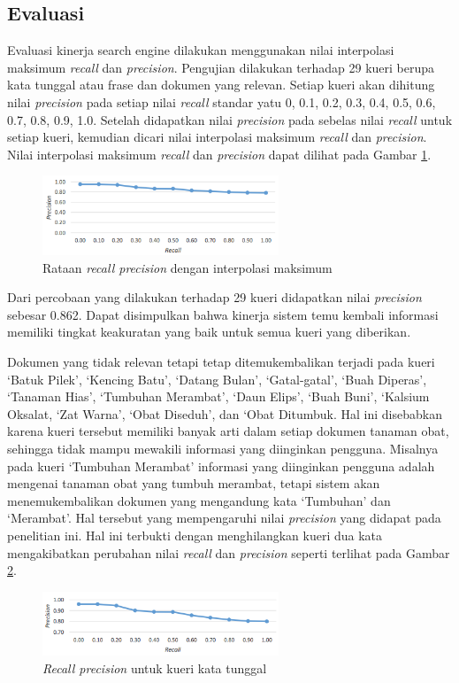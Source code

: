 \subsection*{Evaluasi}
Evaluasi kinerja search engine dilakukan menggunakan nilai interpolasi maksimum \textit{recall} dan \textit{precision}. Pengujian dilakukan terhadap 29 kueri berupa kata tunggal atau frase dan dokumen yang relevan. Setiap kueri akan dihitung nilai \textit{precision} pada setiap nilai \textit{recall} standar yatu 0, 0.1, 0.2, 0.3, 0.4, 0.5, 0.6, 0.7, 0.8, 0.9, 1.0. Setelah didapatkan nilai \textit{precision} pada sebelas nilai \textit{recall} untuk setiap kueri, kemudian dicari nilai interpolasi maksimum \textit{recall} dan \textit{precision}. Nilai interpolasi maksimum \textit{recall} dan \textit{precision} dapat dilihat pada Gambar \ref{fig:recall}.
\begin{figure}[h!]\centering 
\includegraphics[width=200pt]{recall.png}
\caption{Rataan \textit{recall precision} dengan interpolasi maksimum}
\label{fig:recall}
\end{figure}

Dari percobaan yang dilakukan terhadap 29 kueri didapatkan nilai \textit{precision} sebesar 0.862. Dapat disimpulkan bahwa kinerja sistem temu kembali informasi memiliki tingkat keakuratan yang baik untuk semua kueri yang diberikan.

Dokumen yang tidak relevan tetapi tetap ditemukembalikan terjadi pada kueri ‘Batuk Pilek’, ‘Kencing Batu’, ‘Datang Bulan’, ‘Gatal-gatal’, ‘Buah Diperas’, ‘Tanaman Hias’, ‘Tumbuhan Merambat’, ‘Daun Elips’, ‘Buah Buni’, ‘Kalsium Oksalat, ‘Zat Warna’, ‘Obat Diseduh’, dan ‘Obat Ditumbuk. Hal ini disebabkan karena kueri tersebut memiliki banyak arti dalam setiap dokumen tanaman obat, sehingga tidak mampu mewakili informasi yang diinginkan pengguna. Misalnya pada kueri ‘Tumbuhan Merambat’ informasi yang diinginkan pengguna adalah mengenai tanaman obat yang tumbuh merambat, tetapi sistem akan menemukembalikan dokumen yang mengandung kata ‘Tumbuhan’ dan ‘Merambat’. Hal tersebut yang mempengaruhi nilai \textit{precision} yang didapat pada penelitian ini. Hal ini terbukti dengan menghilangkan kueri dua kata mengakibatkan perubahan nilai \textit{recall} dan \textit{precision} seperti terlihat pada Gambar \ref{fig:boosting}.
\begin{figure}[h!]\centering 
\includegraphics[width=200pt]{boosting1.png}
\caption{\textit{Recall precision} untuk kueri kata tunggal}
\label{fig:boosting}
\end{figure}

